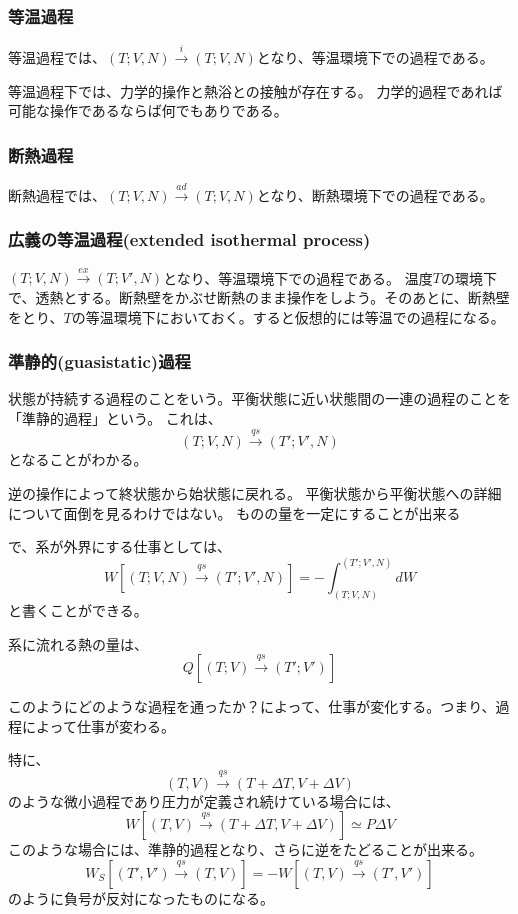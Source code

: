 \documentclass{ltjsarticle}
\begin{document}
\subsubsection{等温過程}
等温過程では、\((T;V,N)\xrightarrow{i} (T;V,N)\)となり、等温環境下での過程である。

等温過程下では、力学的操作と熱浴との接触が存在する。
力学的過程であれば可能な操作であるならば何でもありである。

\subsubsection{断熱過程}
断熱過程では、\((T;V,N)\xrightarrow{ad} (T;V,N)\)となり、断熱環境下での過程である。

\subsubsection{広義の等温過程(extended isothermal process)}
\((T;V,N)\xrightarrow{ex} (T;V',N)\)となり、等温環境下での過程である。
温度\(T\)の環境下で、透熱とする。断熱壁をかぶせ断熱のまま操作をしよう。そのあとに、断熱壁をとり、\(T\)の等温環境下においておく。すると仮想的には等温での過程になる。

\subsubsection{準静的(guasistatic)過程}
状態が持続する過程のことをいう。平衡状態に近い状態間の一連の過程のことを「準静的過程」という。
これは、
\begin{equation}
  (T;V,N) \xrightarrow{qs} (T';V',N)
\end{equation}
となることがわかる。

逆の操作によって終状態から始状態に戻れる。
平衡状態から平衡状態への詳細について面倒を見るわけではない。
ものの量を一定にすることが出来る

で、系が外界にする仕事としては、
\begin{equation}
  W[(T;V,N)\xrightarrow{qs} (T';V',N)] = -\int_{(T;V,N)}^{(T';V',N)}dW
\end{equation}
と書くことができる。

系に流れる熱の量は、
\begin{equation}
  Q[(T;V)\xrightarrow{qs} (T';V')] 
\end{equation}

このようにどのような過程を通ったか？によって、仕事が変化する。つまり、過程によって仕事が変わる。

特に、
\begin{equation}
  (T,V)\xrightarrow{qs} (T+\varDelta T,V+\varDelta V)
\end{equation}
のような微小過程であり圧力が定義され続けている場合には、
\begin{equation}
  W[(T,V) \xrightarrow{qs} (T+\varDelta T,V+\varDelta V)] \simeq P\varDelta V
\end{equation}
このような場合には、準静的過程となり、さらに逆をたどることが出来る。
\begin{equation}
  W_S[(T',V')\xrightarrow{qs}(T,V)] = -W[(T,V)\xrightarrow{qs}(T',V')]
\end{equation}
のように負号が反対になったものになる。
\end{document}
